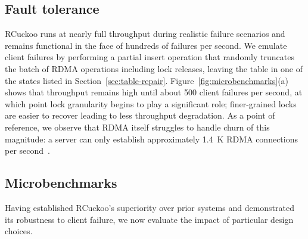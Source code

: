 
\subsection{Fault tolerance}


RCuckoo runs at nearly full throughput during realistic
failure scenarios and remains functional in the face of
hundreds of failures per second.
We emulate client failures by
performing a partial insert operation that randomly truncates the
batch of RDMA operations including lock releases, leaving the table
in one of the  states listed in
Section~\ref{sec:table-repair}.
Figure~\ref{fig:microbenchmarks}(a) shows that
throughput remains high until about 500 client failures per second, at
which point lock granularity begins to play a significant role;
finer-grained locks are easier to recover leading to less throughput
degradation.
As a point of reference, we observe that RDMA itself struggles to handle churn of this magnitude:
a server can only
establish approximately 1.4~K RDMA connections per second~\cite{xrdma}.

\subsection{Microbenchmarks}
\label{ss:mb}

Having established RCuckoo's superiority over prior systems and
demonstrated its robustness to client failure, we now evaluate the
impact of particular design choices.





